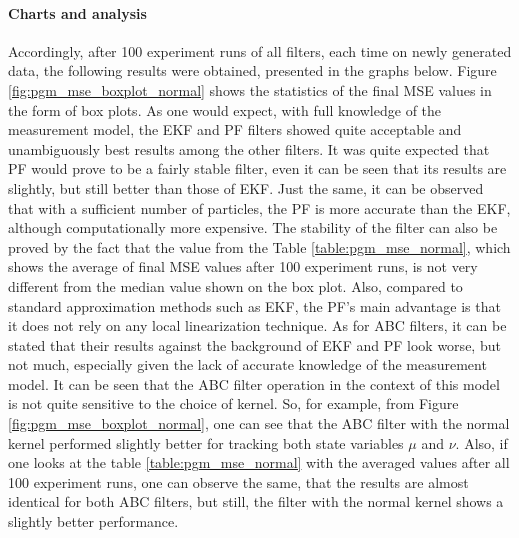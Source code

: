 \paragraph*{Charts and analysis}
Accordingly, after 100 experiment runs of all filters, each time on newly generated data, the following results were obtained, presented in the graphs below. Figure \ref{fig:pgm_mse_boxplot_normal} shows the statistics of the final MSE values in the form of box plots. As one would expect, with full knowledge of the measurement model, the EKF and PF filters showed quite acceptable and unambiguously best results among the other filters. It was quite expected that PF would prove to be a fairly stable filter, even it can be seen that its results are slightly, but still better than those of EKF. Just the same, it can be observed that with a sufficient number of particles, the PF is more accurate than the EKF, although computationally more expensive. The stability of the filter can also be proved by the fact that the value from the Table \ref{table:pgm_mse_normal}, which shows the average of final MSE values after 100 experiment runs, is not very different from the median value shown on the box plot. Also, compared to standard approximation methods such as EKF, the PF's main advantage is that it does not rely on any local linearization technique. As for ABC filters, it can be stated that their results against the background of EKF and PF look worse, but not much, especially given the lack of accurate knowledge of the measurement model. It can be seen that the ABC filter operation in the context of this model is not quite sensitive to the choice of kernel. So, for example, from Figure \ref{fig:pgm_mse_boxplot_normal}, one can see that the ABC filter with the normal kernel performed slightly better for tracking both state variables \(\mu\) and \(\nu\). Also, if one looks at the table \ref{table:pgm_mse_normal} with the averaged values after all 100 experiment runs, one can observe the same, that the results are almost identical for both ABC filters, but still, the filter with the normal kernel shows a slightly better performance.


